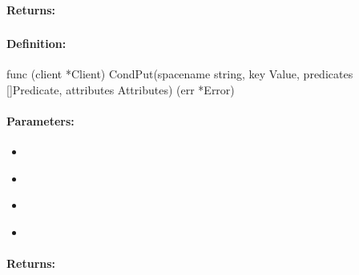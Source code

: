 \paragraph{Returns:}


\pagebreak
\subsubsection{}
\label{api:Go:CondPut}


\paragraph{Definition:}
\begin{gocode}
func (client *Client) CondPut(spacename string, key Value, predicates []Predicate, attributes Attributes) (err *Error)
\end{gocode}

\paragraph{Parameters:}
\begin{itemize}[noitemsep]
\item {}\\

\item {}\\

\item {}\\

\item {}\\

\end{itemize}

\paragraph{Returns:}


\pagebreak
\subsubsection{}
\label{api:Go:GroupPut}


